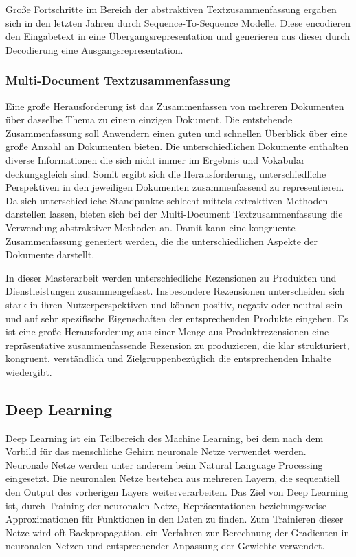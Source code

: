 Große Fortschritte im Bereich der abstraktiven Textzusammenfassung ergaben sich in den letzten Jahren durch Sequence-To-Sequence Modelle. Diese encodieren den Eingabetext in eine Übergangsrepresentation und generieren aus dieser durch Decodierung eine Ausgangsrepresentation.

\subsubsection{Multi-Document Textzusammenfassung}
Eine große Herausforderung ist das Zusammenfassen von mehreren Dokumenten über dasselbe Thema zu einem einzigen Dokument. 
Die entstehende Zusammenfassung soll Anwendern einen guten und schnellen Überblick über eine große Anzahl an Dokumenten bieten. 
Die unterschiedlichen Dokumente enthalten diverse Informationen die sich nicht immer im Ergebnis und Vokabular deckungsgleich sind. 
Somit ergibt sich die Herausforderung, unterschiedliche Perspektiven in den jeweiligen Dokumenten zusammenfassend zu representieren.
Da sich unterschiedliche Standpunkte schlecht mittels extraktiven Methoden darstellen lassen, bieten sich bei der Multi-Document Textzusammenfassung die Verwendung abstraktiver Methoden an.
Damit kann eine kongruente Zusammenfassung generiert werden, die die unterschiedlichen Aspekte der Dokumente darstellt.

In dieser Masterarbeit werden unterschiedliche Rezensionen zu Produkten und Dienstleistungen zusammengefasst. 
Insbesondere Rezensionen unterscheiden sich stark in ihren Nutzerperspektiven und können positiv, negativ oder neutral sein und auf sehr spezifische Eigenschaften der entsprechenden Produkte eingehen.
Es ist eine große Herausforderung aus einer Menge aus Produktrezensionen eine repräsentative zusammenfassende Rezension zu produzieren, die klar strukturiert, kongruent, verständlich und Zielgruppenbezüglich die entsprechenden Inhalte wiedergibt.

\subsection{Deep Learning}
Deep Learning ist ein Teilbereich des Machine Learning, bei dem nach dem Vorbild für das menschliche Gehirn neuronale Netze verwendet werden. 
Neuronale Netze werden unter anderem beim Natural Language Processing eingesetzt. 
Die neuronalen Netze bestehen aus mehreren Layern, die sequentiell den Output des vorherigen Layers weiterverarbeiten. 
Das Ziel von Deep Learning ist, durch Training der neuronalen Netze, Repräsentationen beziehungsweise Approximationen für Funktionen in den Daten zu finden.
Zum Trainieren dieser Netze wird oft Backpropagation, ein Verfahren zur Berechnung der Gradienten in neuronalen Netzen und entsprechender Anpassung der Gewichte verwendet.

